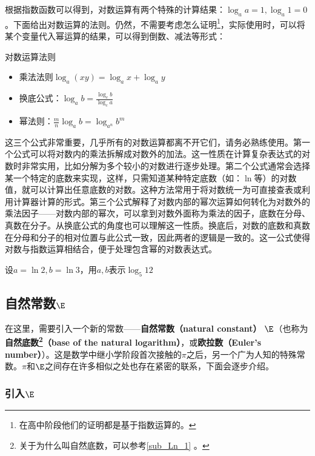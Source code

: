 根据指数函数可以得到，对数运算有两个特殊的计算结果：$\log_a a=1,\log_a1=0$。下面给出对数运算的法则。仍然，不需要考虑怎么证明\footnote{在高中阶段他们的证明都是基于指数运算的。}，实际使用时，可以将某个变量代入幂运算的结果，可以得到倒数、减法等形式：

\begin{theorem}{对数运算法则}
\begin{itemize}
\item 乘法法则$\log_a(xy)=\log_ax+\log_ay$
\item 换底公式：$\displaystyle \log_a b=\frac{\log_cb}{\log_ca}$
\item 幂法则：$\displaystyle \frac{m}{n}\log_a b=\log_{a^n} b^m$
\end{itemize}
\end{theorem}

这三个公式非常重要，几乎所有的对数运算都离不开它们，请务必熟练使用。第一个公式可以将对数内的乘法拆解成对数外的加法。这一性质在计算复杂表达式的对数时非常实用，比如分解为多个较小的对数进行逐步处理。第二个公式通常会选择某一个特定的底数来实现，这样，只需知道某种特定底数（如：$\ln$等）的对数值，就可以计算出任意底数的对数。这种方法常用于将对数统一为可直接查表或利用计算器计算的形式。第三个公式解释了对数内部的幂次运算如何转化为对数外的乘法因子——对数内部的幂次，可以拿到对数外面称为乘法的因子，底数在分母、真数在分子。从换底公式的角度也可以理解这一性质。换底后，对数的底数和真数在分母和分子的相对位置与此公式一致，因此两者的逻辑是一致的。这一公式使得对数与指数运算相结合，便于处理包含幂的对数表达式。

\begin{example}{设$a=\ln2,b=\ln3$，用$a,b$表示$\log_5 12$}

\end{example}

\subsection{自然常数$\E$}

在这里，需要引入一个新的常数——\textbf{自然常数（natural constant）} $\E$（也称为\textbf{自然底数\footnote{关于为什么叫自然底数，可以参考\autoref{sub_Ln_1} 。}（base of the natural logarithm）}，或\textbf{欧拉数（Euler’s number）}）。这是数学中继小学阶段首次接触的$\pi$之后，另一个广为人知的特殊常数。$\pi$和$\E$之间存在许多相似之处也存在紧密的联系，下面会逐步介绍。

\subsubsection{引入$\E$}

